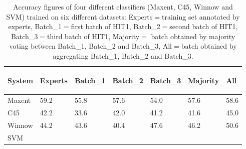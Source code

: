 \documentclass[11pt,letterpaper]{article}
\begin{document}
\begin{table}
\begin{center}
\begin{small}
\begin{tabular}{|l|l|l|l|l|l|l|} \hline
 System & 
 {\begin{sideways}\parbox{2cm}{\centering Experts}\end{sideways}} &
 {\begin{sideways}\parbox{2cm}{\centering Batch\_1}\end{sideways}} &
 {\begin{sideways}\parbox{2cm}{\centering Batch\_2}\end{sideways}} &
 {\begin{sideways}\parbox{2cm}{\centering Batch\_3}\end{sideways}} &
 {\begin{sideways}\parbox{2cm}{\centering Majority}\end{sideways}} &
 {\begin{sideways}\parbox{2cm}{\centering All}\end{sideways}} \\ \hline
 Maxent & 59.2 & 55.8 & 57.6 & 54.0 & 57.6 & 58.6 \\ \hline
 C45 & 42.2 & 33.6 & 42.0 & 41.2 & 41.6 & 45.0 \\ \hline
 Winnow & 44.2 & 43.6 & 40.4 & 47.6 & 46.2 & 50.6 \\ \hline
 SVM &  &  &  &  &  &  \\ \hline
\end{tabular}
\end{small}
\end{center}
\caption{Accuracy figures of four different classifiers (Maxent, C45, Winnow and SVM) trained on six different datasets: Experts$=$training set annotated by experts, Batch\_1$=$first batch of HIT1, Batch\_2$=$second batch of HIT1, Batch\_3$=$third batch of HIT1, Majority$=$ batch obtained by majority voting between Batch\_1, Batch\_2 and Batch\_3, All$=$batch obtained by aggregating Batch\_1, Batch\_2 and Batch\_3.}
\label{table:amtvsexp}
\end{table}

\end{document}

